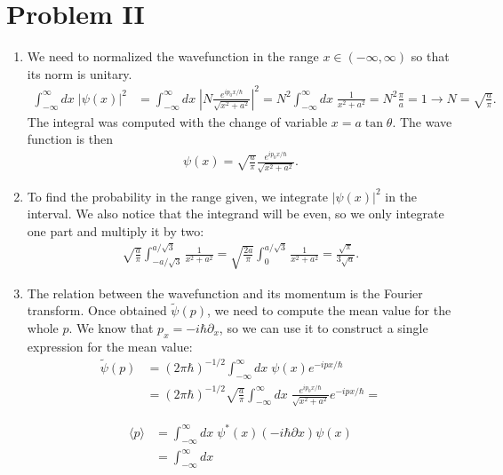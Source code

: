 \documentclass[letterpaper,11pt,twoside]{article}
\newcommand{\braket}[1]{\langle#1\rangle}
\begin{document}
\section*{Problem II}
\begin{enumerate}[itemsep=0pt,topsep=0pt,label=\alph*.]
  \item We need to normalized the wavefunction in the range $x\in(-\infty,\infty)$ so that its norm is unitary.
  \begin{align*}
    \int_{-\infty}^\infty dx\;|\psi(x)|^2&=\int_{-\infty}^\infty dx\;\left|N\frac{e^{ip_0x/\hbar}}{\sqrt{x^2+a^2}}\right|^2=N^2\int_{-\infty}^\infty dx\;\frac{1}{x^2+a^2}=N^2\frac{\pi}{a}=1\longrightarrow N=\sqrt{\frac{a}{\pi}}.
  \end{align*}
  The integral was computed with the change of variable $x=a\tan\theta$. The wave function is then
  \begin{align*}
    \psi(x)=\sqrt{\frac{a}{\pi}}\frac{e^{ip_0x/\hbar}}{\sqrt{x^2+a^2}}.
  \end{align*}
  \item To find the probability in the range given, we integrate $|\psi(x)|^2$ in the interval. We also notice that the integrand will be even, so we only integrate one part and multiply it by two:
  \begin{align*}
    \sqrt{\frac{a}{\pi}}\int_{-a/\sqrt{3}}^{a/\sqrt{3}}\frac{1}{x^2+a^2}=\sqrt{\frac{2a}{\pi}}\int_{0}^{a/\sqrt{3}}\frac{1}{x^2+a^2}=\frac{\sqrt{\pi}}{3\sqrt{a}}.
  \end{align*}
  \item The relation between the wavefunction and its momentum is the Fourier transform. Once obtained $\tilde{\psi}(p)$, we need to compute the mean value for the whole $p$. 
  We know that $p_x=-i\hbar\partial_x$, so we can use it to construct a single expression for the mean value: 
  \begin{align*}
    \tilde{\psi}(p)&=(2\pi\hbar)^{-1/2}\int_{-\infty}^\infty dx\;\psi(x)e^{-ipx/\hbar}\\
    &=(2\pi\hbar)^{-1/2}\sqrt{\frac{a}{\pi}}\int_{-\infty}^\infty dx\;\frac{e^{ip_0x/\hbar}}{\sqrt{x^2+a^2}}e^{-ipx/\hbar}=
  \end{align*}

  \begin{align*}
    \braket{p}&=\int_{-\infty}^\infty dx\;\psi^*(x)(-i\hbar\partial x)\psi(x)\\
    &=\int_{-\infty}^\infty dx\; 
  \end{align*} 
\end{enumerate}
\end{document}
